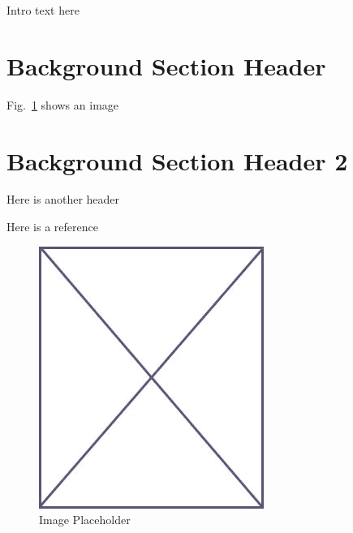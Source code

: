 Intro text here

\section{Background Section Header}
\label{sec:back_sec_1}

Fig.~\ref{fig:placeholder_bak} shows an image

\section{Background Section Header 2}
\label{sec:back_sec_2}

Here is another header

Here is a reference ~\cite{buttazzo1993rre}


\begin{figure}
\begin{center}
\vspace{-32pt}
\includegraphics[scale=.45]{figs/placeholder}
\end{center}
\vspace{-12pt}
\caption{Image Placeholder}
\label{fig:placeholder_bak}
\end{figure}
